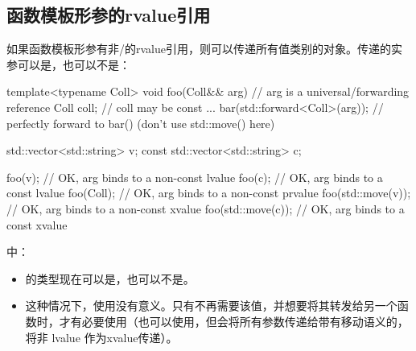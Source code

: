 \subsection{函数模板形参的rvalue引用}

如果函数模板形参有非/的rvalue引用，则可以传递所有值类别的对象。传递的实参可以是，也可以不是：

\begin{cppcode}
template<typename Coll>
void foo(Coll&& arg) // arg is a universal/forwarding reference
{
	Coll coll; // coll may be const
	...
	bar(std::forward<Coll>(arg)); // perfectly forward to bar() (don’t use std::move() here)
}

std::vector<std::string> v;
const std::vector<std::string> c;

foo(v); // OK, arg binds to a non-const lvalue
foo(c); // OK, arg binds to a const lvalue
foo(Coll{}); // OK, arg binds to a non-const prvalue
foo(std::move(v)); // OK, arg binds to a non-const xvalue
foo(std::move(c)); // OK, arg binds to a const xvalue
\end{cppcode}

中：

\begin{itemize}
	\item {}的类型现在可以是，也可以不是。
	\item 这种情况下，使用没有意义。只有不再需要该值，并想要将其转发给另一个函数时，才有必要使用（也可以使用，但会将所有参数传递给带有移动语义的，将非 lvalue 作为xvalue传递）。
\end{itemize}












